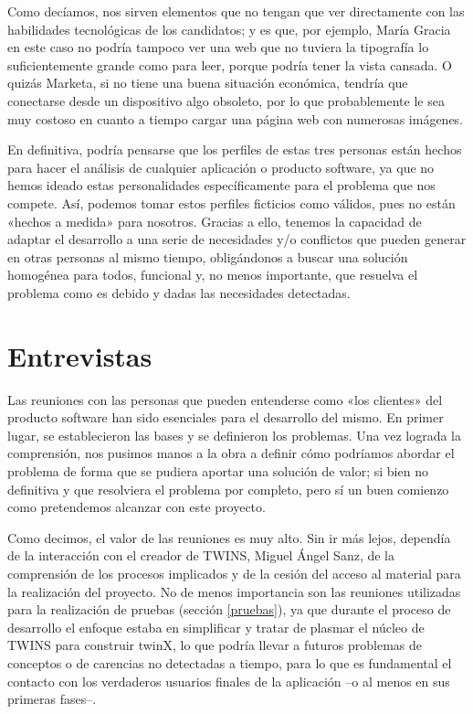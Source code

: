 Como decíamos, nos sirven elementos que no tengan que ver directamente con las habilidades tecnológicas de los candidatos; y es que, por ejemplo, María Gracia en este caso no podría tampoco ver una web que no tuviera la tipografía lo suficientemente grande como para leer, porque podría tener la vista cansada. O quizás Marketa, si no tiene una buena situación económica, tendría que conectarse desde un dispositivo algo obsoleto, por lo que probablemente le sea muy costoso en cuanto a tiempo cargar una página web con numerosas imágenes.

En definitiva, podría pensarse que los perfiles de estas tres personas están hechos para hacer el análisis de cualquier aplicación o producto software, ya que no hemos ideado estas personalidades específicamente para el problema que nos compete. Así, podemos tomar estos perfiles ficticios como válidos, pues no están «hechos a medida» para nosotros. Gracias a ello, tenemos la capacidad de adaptar el desarrollo a una serie de necesidades y/o conflictos que pueden generar en otras personas al mismo tiempo, obligándonos a buscar una solución homogénea para todos, funcional y, no menos importante, que resuelva el problema como es debido y dadas las necesidades detectadas.

\section{Entrevistas}
\label{sec:entrevistas}

Las reuniones con las personas que pueden entenderse como «los clientes» del producto software han sido esenciales para el desarrollo del mismo. En primer lugar, se establecieron las bases y se definieron los problemas. Una vez lograda la comprensión, nos pusimos manos a la obra a definir cómo podríamos abordar el problema de forma que se pudiera aportar una solución de valor; si bien no definitiva y que resolviera el problema por completo, pero sí un buen comienzo como pretendemos alcanzar con este proyecto.

Como decimos, el valor de las reuniones es muy alto. Sin ir más lejos, dependía de la interacción con el creador de TWINS, Miguel Ángel Sanz, de la comprensión de los procesos implicados y de la cesión del acceso al material para la realización del proyecto. No de menos importancia son las reuniones utilizadas para la realización de pruebas (sección \ref{pruebas}), ya que durante el proceso de desarrollo el enfoque estaba en simplificar y tratar de plasmar el núcleo de TWINS para construir twinX, lo que podría llevar a futuros problemas de conceptos o de carencias no detectadas a tiempo, para lo que es fundamental el contacto con los verdaderos usuarios finales de la aplicación --o al menos en sus primeras fases--.%

